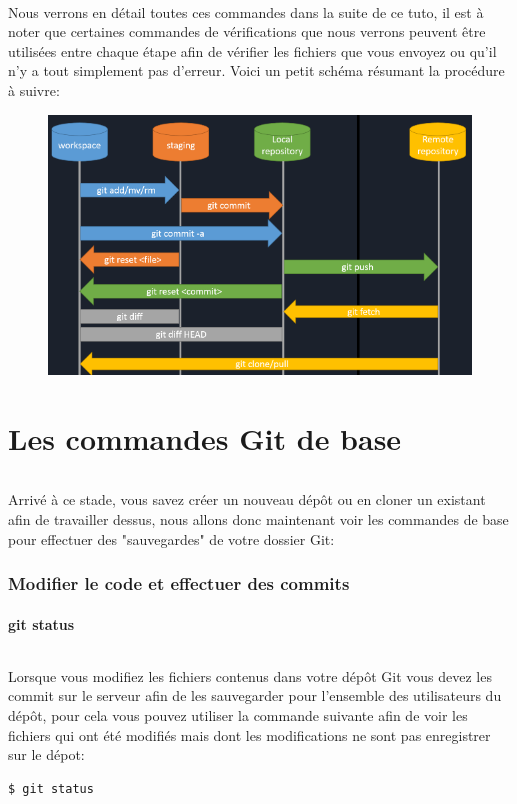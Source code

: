 \documentclass[french, a4paper, 12pt, titlepage]{article}
\begin{document}
\paragraph{}Nous verrons en détail toutes ces commandes dans la suite de ce tuto, il est à noter que certaines commandes de vérifications que nous verrons peuvent être utilisées entre chaque étape afin de vérifier les fichiers que vous envoyez ou qu'il n'y a tout simplement pas d'erreur. Voici un petit schéma résumant la procédure à suivre:
\begin{figure}[h]
\includegraphics[width=\textwidth]{DeroulementProtocoleGit}
\end{figure}

\newpage
\part{Les commandes Git de base}
\paragraph{}Arrivé à ce stade, vous savez créer un nouveau dépôt ou en cloner un existant afin de travailler dessus, nous allons donc maintenant voir les commandes de base pour effectuer des "sauvegardes" de votre dossier Git:

\section{Modifier le code et effectuer des commits}
\subsection{git status}
\paragraph{}Lorsque vous modifiez les fichiers contenus dans votre dépôt Git vous devez les commit sur le serveur afin de les sauvegarder pour l'ensemble des utilisateurs du dépôt, pour cela vous pouvez utiliser la commande suivante afin de voir les fichiers qui ont été modifiés mais dont les modifications ne sont pas enregistrer sur le dépot:
\begin{lstlisting}
$ git status
\end{lstlisting}
\end{document}
